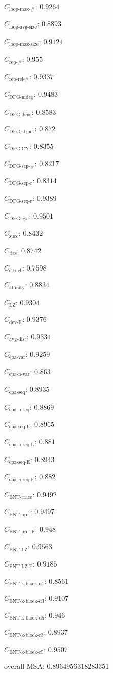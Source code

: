 \documentclass[a4paper]{article}
\newcommand{\loopmaxname}{\text{loop-max-\#}}
\newcommand{\loopmax}{C_{\loopmaxname}}
\newcommand{\loopavgsizename}{\text{loop-avg-size}}
\newcommand{\loopavgsize}{C_{\loopavgsizename}}
\newcommand{\loopmaxsizename}{\text{loop-max-size}}
\newcommand{\loopmaxsize}{C_{\loopmaxsizename}}
\newcommand{\repnumname}{\text{rep-\#}}
\newcommand{\repnum}{C_{\repnumname}}
\newcommand{\reprelnumname}{\text{rep-rel-\#}}
\newcommand{\reprelnum}{C_{\reprelnumname}}
\newcommand{\dfgmaxdegname}{\text{DFG-mdeg}}
\newcommand{\dfgmaxdeg}{C_{\dfgmaxdegname}}
\newcommand{\dfgdensname}{\text{DFG-dens}}
\newcommand{\dfgdens}{C_{\dfgdensname}}
\newcommand{\dfgstructname}{\text{DFG-struct}}
\newcommand{\dfgstruct}{C_{\dfgstructname}}
\newcommand{\dfgcycnumbername}{\text{DFG-CN}}
\newcommand{\dfgcycnumber}{C_{\dfgcycnumbername}}
\newcommand{\dfgsepnumname}{\text{DFG-sep-\#}}
\newcommand{\dfgsepnum}{C_{\dfgsepnumname}}
\newcommand{\dfgseprationame}{\text{DFG-sep-r}}
\newcommand{\dfgsepratio}{C_{\dfgseprationame}}
\newcommand{\dfgseqrationame}{\text{DFG-seq-r}}
\newcommand{\dfgseqratio}{C_{\dfgseqrationame}}
\newcommand{\dfgcycname}{\text{DFG-cyc}}
\newcommand{\dfgcyc}{C_{\dfgcycname}}
\newcommand{\numberofneighborhoodsname}{\text{succ}}
\newcommand{\numberofneighborhoods}{C_{\numberofneighborhoodsname}}
\newcommand{\numberoftiesname}{\text{ties}}
\newcommand{\numberofties}{C_{\numberoftiesname}}
\newcommand{\lempelzivname}{\text{LZ}}
\newcommand{\lempelziv}{C_{\lempelzivname}}
\newcommand{\structurename}{\text{struct}}
\newcommand{\structure}{C_{\structurename}}
\newcommand{\affinityname}{\text{affinity}}
\newcommand{\affinity}{C_{\affinityname}}
\newcommand{\deviationfromrandomname}{\text{dev-R}}
\newcommand{\deviationfromrandom}{C_{\deviationfromrandomname}}
\newcommand{\avgdistname}{\text{avg-dist}}
\newcommand{\avgdist}{C_{\avgdistname}}
\newcommand{\enttracename}{\text{ENT-trace}}
\newcommand{\enttrace}{C_{\enttracename}}
\newcommand{\entprefixname}{\text{ENT-pref}}
\newcommand{\entprefix}{C_{\entprefixname}}
\newcommand{\entprefixflatname}{\text{ENT-pref-F}}
\newcommand{\entprefixflat}{C_{\entprefixflatname}}
\newcommand{\entlempelzivname}{\text{ENT-LZ}}
\newcommand{\entlempelziv}{C_{\entlempelzivname}}
\newcommand{\entlempelzivflatname}{\text{ENT-LZ-F}}
\newcommand{\entlempelzivflat}{C_{\entlempelzivflatname}}
\newcommand{\entkblockdonename}{\text{ENT-k-block-d1}}
\newcommand{\entkblockdone}{C_{\entkblockdonename}}
\newcommand{\entkblockdthreename}{\text{ENT-k-block-d3}}
\newcommand{\entkblockdthree}{C_{\entkblockdthreename}}
\newcommand{\entkblockdfivename}{\text{ENT-k-block-d5}}
\newcommand{\entkblockdfive}{C_{\entkblockdfivename}}
\newcommand{\entkblockrthreename}{\text{ENT-k-block-r3}}
\newcommand{\entkblockrthree}{C_{\entkblockrthreename}}
\newcommand{\entkblockrfivename}{\text{ENT-k-block-r5}}
\newcommand{\entkblockrfive}{C_{\entkblockrfivename}}
\newcommand{\epavariantname}{\text{epa-var}}
\newcommand{\epavariant}{C_{\epavariantname}}
\newcommand{\epanormvariantname}{\text{epa-n-var}}
\newcommand{\epanormvariant}{C_{\epanormvariantname}}
\newcommand{\epasequencename}{\text{epa-seq}}
\newcommand{\epasequence}{C_{\epasequencename}}
\newcommand{\epanormsequencename}{\text{epa-n-seq}}
\newcommand{\epanormsequence}{C_{\epanormsequencename}}
\newcommand{\epasequencelname}{\text{epa-seq-L}}
\newcommand{\epasequencel}{C_{\epasequencelname}}
\newcommand{\epanormsequencelname}{\text{epa-n-seq-L}}
\newcommand{\epanormsequencel}{C_{\epanormsequencelname}}
\newcommand{\epasequenceename}{\text{epa-seq-E}}
\newcommand{\epasequencee}{C_{\epasequenceename}}
\newcommand{\epanormsequenceename}{\text{epa-n-seq-E}}
\newcommand{\epanormsequencee}{C_{\epanormsequenceename}}
\begin{document}
\begin{compactitem}
\item $\loopmax$: $0.9264$
\item $\loopavgsize$: $0.8893$
\item $\loopmaxsize$: $0.9121$
\item $\repnum$: $0.955$
\item $\reprelnum$: $0.9337$
\item $\dfgmaxdeg$: $0.9483$
\item $\dfgdens$: $0.8583$
\item $\dfgstruct$: $0.872$
\item $\dfgcycnumber$: $0.8355$
\item $\dfgsepnum$: $0.8217$
\item $\dfgsepratio$: $0.8314$
\item $\dfgseqratio$: $0.9389$
\item $\dfgcyc$: $0.9501$
\item $\numberofneighborhoods$: $0.8432$
\item $\numberofties$: $0.8742$
\item $\structure$: $0.7598$
\item $\affinity$: $0.8834$
\item $\lempelziv$: $0.9304$
\item $\deviationfromrandom$: $0.9376$
\item $\avgdist$: $0.9331$
\item $\epavariant$: $0.9259$
\item $\epanormvariant$: $0.863$
\item $\epasequence$: $0.8935$
\item $\epanormsequence$: $0.8869$
\item $\epasequencel$: $0.8965$
\item $\epanormsequencel$: $0.881$
\item $\epasequencee$: $0.8943$
\item $\epanormsequencee$: $0.882$
\item $\enttrace$: $0.9492$
\item $\entprefix$: $0.9497$
\item $\entprefixflat$: $0.948$
\item $\entlempelziv$: $0.9563$
\item $\entlempelzivflat$: $0.9185$
\item $\entkblockdone$: $0.8561$
\item $\entkblockdthree$: $0.9107$
\item $\entkblockdfive$: $0.946$
\item $\entkblockrthree$: $0.8937$
\item $\entkblockrfive$: $0.9507$
\item overall MSA: $0.8964956318283351$
\end{compactitem}
\end{document}
